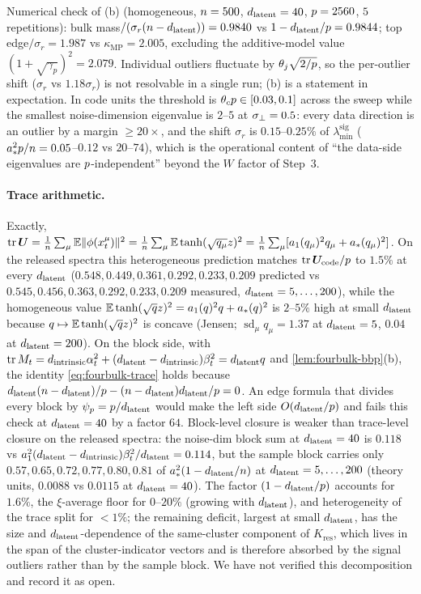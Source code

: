 Numerical check of (b) (homogeneous, $n=500$, $d_{\mathrm{latent}}=40$, $p=2560$, $5$ repetitions): bulk mass$/(\sigma_r(n-d_{\mathrm{latent}}))=0.9840$ vs $1-d_{\mathrm{latent}}/p=0.9844$; top edge$/\sigma_r=1.987$ vs $\kappa_{\mathrm{MP}}=2.005$, excluding the additive-model value $(1+\sqrt{\gamma_p})^2=2.079$. Individual outliers fluctuate by $\theta_j\sqrt{2/p}$, so the per-outlier shift ($\sigma_r$ vs $1.18\sigma_r$) is not resolvable in a single run; (b) is a statement in expectation. In code units the threshold is $\theta_cp\in[0.03,0.1]$ across the sweep while the smallest noise-dimension eigenvalue is $2$--$5$ at $\sigma_{\perp}=0.5$: every data direction is an outlier by a margin $\ge20\times$, and the shift $\sigma_r$ is $0.15$--$0.25\%$ of $\lambda^{\mathrm{sig}}_{\min}$ ($a_*^2p/n=0.05$--$0.12$ vs $20$--$74$), which is the operational content of ``the data-side eigenvalues are $p$-independent'' beyond the $W$ factor of Step~3.

\paragraph{Trace arithmetic.}
Exactly, $\operatorname{tr}\bm{U}=\tfrac1{n}\sum_\mu\mathbb{E}\|\phi(x_t^\mu)\|^2=\tfrac1{n}\sum_\mu\mathbb{E}\tanh(\sqrt{q_\mu}z)^2=\tfrac1{n}\sum_\mu[a_1(q_\mu)^2q_\mu+a_*(q_\mu)^2]$. On the released spectra this heterogeneous prediction matches $\operatorname{tr}\bm{U}_{\mathrm{code}}/p$ to $1.5\%$ at every $d_{\mathrm{latent}}$ ($0.548,0.449,0.361,0.292,0.233,0.209$ predicted vs $0.545,0.456,0.363,0.292,0.233,0.209$ measured, $d_{\mathrm{latent}}=5,\dots,200$), while the homogeneous value $\mathbb{E}\tanh(\sqrt qz)^2=a_1(q)^2q+a_*(q)^2$ is $2$--$5\%$ high at small $d_{\mathrm{latent}}$ because $q\mapsto\mathbb{E}\tanh(\sqrt qz)^2$ is concave (Jensen; $\operatorname{sd}_\mu q_\mu=1.37$ at $d_{\mathrm{latent}}=5$, $0.04$ at $d_{\mathrm{latent}}=200$). On the block side, with $\operatorname{tr}M_t=d_{\mathrm{intrinsic}}\alpha_t^2+(d_{\mathrm{latent}}-d_{\mathrm{intrinsic}})\beta_t^2=d_{\mathrm{latent}} q$ and \cref{lem:fourbulk-bbp}(b), the identity \eqref{eq:fourbulk-trace} holds because $d_{\mathrm{latent}}(n-d_{\mathrm{latent}})/p-(n-d_{\mathrm{latent}})d_{\mathrm{latent}}/p=0$. An edge formula that divides every block by $\psi_p=p/d_{\mathrm{latent}}$ would make the left side $O(d_{\mathrm{latent}}/p)$ and fails this check at $d_{\mathrm{latent}}=40$ by a factor $64$. Block-level closure is weaker than trace-level closure on the released spectra: the noise-dim block sum at $d_{\mathrm{latent}}=40$ is $0.118$ vs $a_1^2(d_{\mathrm{latent}}-d_{\mathrm{intrinsic}})\beta_t^2/d_{\mathrm{latent}}=0.114$, but the sample block carries only $0.57,0.65,0.72,0.77,0.80,0.81$ of $a_*^2(1-d_{\mathrm{latent}}/n)$ at $d_{\mathrm{latent}}=5,\dots,200$ (theory units, $0.0088$ vs $0.0115$ at $d_{\mathrm{latent}}=40$). The factor $(1-d_{\mathrm{latent}}/p)$ accounts for $1.6\%$, the $\xi$-average floor for $0$--$20\%$ (growing with $d_{\mathrm{latent}}$), and heterogeneity of the trace split for $<1\%$; the remaining deficit, largest at small $d_{\mathrm{latent}}$, has the size and $d_{\mathrm{latent}}$-dependence of the same-cluster component of $K_{\mathrm{res}}$, which lives in the span of the cluster-indicator vectors and is therefore absorbed by the signal outliers rather than by the sample block. We have not verified this decomposition and record it as open.

